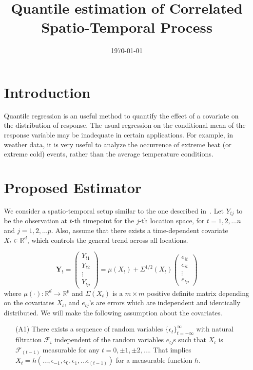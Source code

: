 \documentclass[11pt]{article}
\title{Quantile estimation of Correlated Spatio-Temporal Process}
\author{}
\date{\today}
\def\R{\mathbb{R}}
\newcommand{\bb}[1]{\boldsymbol{#1}}
\newcommand{\Fcal}{\mathcal{F}}
\theoremstyle{general}
\numberwithin{equation}{section}
\begin{document}
\maketitle

\section{Introduction}

Quantile regression is an useful method to quantify the effect of a covariate on the distribution of response. The usual regression on the conditional mean of the response variable may be inadequate in certain applications. For example, in weather data, it is very useful to analyze the occurrence of extreme heat (or extreme cold) events, rather than the average temperature conditions. 


\section{Proposed Estimator}

We consider a spatio-temporal setup similar to the one described in~\cite{deb2021nonparametric}. Let $Y_{tj}$ to be the observation at $t$-th timepoint for the $j$-th location space, for $t = 1, 2, \dots n$ and $j = 1, 2, \dots p$. Also, assume that there exists a time-dependent covariate $X_t \in \R^d$, which controls the general trend across all locations. 

\begin{equation}
    \bb{Y}_t = \begin{pmatrix}
    Y_{t1}\\ Y_{t2} \\ \vdots \\ Y_{tp}
    \end{pmatrix} = \mu(X_t) + \Sigma^{1/2}(X_t) \begin{pmatrix}
    e_{it}\\ e_{it} \\ \vdots \\ e_{tp}
    \end{pmatrix}
    \label{eqn:setup}
\end{equation}
\noindent where $\mu(\cdot): \R^d \rightarrow \R^p$ and $\Sigma(X_t)$ is a $m\times m$ positive definite matrix depending on the covariates $X_t$, and $e_{tj}$'s are errors which are independent and identically distributed. We will make the following assumption about the covariates.
\begin{enumerate}
    \item[(A1)] There exists a sequence of random variables $\{\epsilon_t\}_{t = -\infty}^{\infty}$ with natural filtration $\Fcal_t$ independent of the random variables $e_{tj}$s such that $X_t$ is $\Fcal_{(t-1)}$ measurable for any $t = 0, \pm 1, \pm 2, \dots$. That implies $X_t = h(\dots, \epsilon_{-1}, \epsilon_0, \epsilon_1, \dots \epsilon_{(t-1)})$ for a measurable function $h$.
\end{enumerate}
\end{document}
